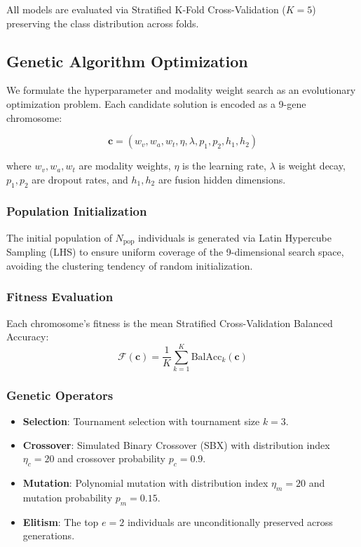 \documentclass[conference]{IEEEtran}
\begin{document}
All models are evaluated via Stratified K-Fold Cross-Validation ($K=5$) preserving the class distribution across folds.

\subsection{Genetic Algorithm Optimization}
\label{sec:ga}

We formulate the hyperparameter and modality weight search as an evolutionary optimization problem. Each candidate solution is encoded as a 9-gene chromosome:

\begin{equation}
    \mathbf{c} = (w_v, w_a, w_t, \eta, \lambda, p_1, p_2, h_1, h_2)
\end{equation}

where $w_v, w_a, w_t$ are modality weights, $\eta$ is the learning rate, $\lambda$ is weight decay, $p_1, p_2$ are dropout rates, and $h_1, h_2$ are fusion hidden dimensions.

\subsubsection{Population Initialization}
The initial population of $N_{\text{pop}}$ individuals is generated via Latin Hypercube Sampling (LHS) to ensure uniform coverage of the 9-dimensional search space, avoiding the clustering tendency of random initialization.

\subsubsection{Fitness Evaluation}
Each chromosome's fitness is the mean Stratified Cross-Validation Balanced Accuracy:
\begin{equation}
    \mathcal{F}(\mathbf{c}) = \frac{1}{K} \sum_{k=1}^{K} \text{BalAcc}_k(\mathbf{c})
\end{equation}

\subsubsection{Genetic Operators}
\begin{itemize}
    \item \textbf{Selection}: Tournament selection with tournament size $k=3$.
    \item \textbf{Crossover}: Simulated Binary Crossover (SBX) with distribution index $\eta_c = 20$ and crossover probability $p_c = 0.9$.
    \item \textbf{Mutation}: Polynomial mutation with distribution index $\eta_m = 20$ and mutation probability $p_m = 0.15$.
    \item \textbf{Elitism}: The top $e=2$ individuals are unconditionally preserved across generations.
\end{itemize}
\end{document}
